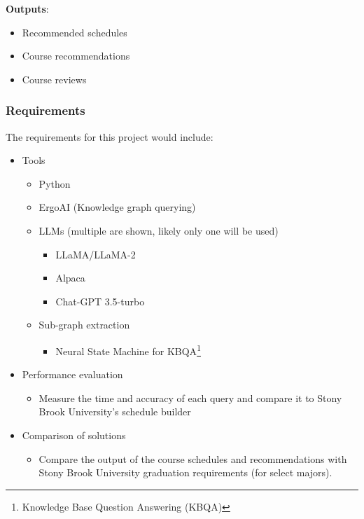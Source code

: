 \documentclass[12pt]{article}
\begin{document}
    \textbf{Outputs}:

    \begin{itemize}
        \label{items:outputs}
        \item Recommended schedules
        \item Course recommendations
        \item Course reviews
    \end{itemize}

    \subsubsection{Requirements}
    \label{subsubsec:reqs}
    The requirements for this project would include:

    \begin{itemize}
        \item Tools
        \begin{itemize}
            \item Python
            \item ErgoAI (Knowledge graph querying)
            \item LLMs (multiple are shown, likely only one will be used)
            \begin{itemize}
                \item LLaMA\cite{touvron2023llama}/LLaMA-2\cite{touvron2023llama2}
                \item Alpaca\cite{alpaca}
                \item Chat-GPT 3.5-turbo\cite{ye2023gpt3.5}
            \end{itemize}
            \item Sub-graph extraction
            \begin{itemize}
                \item Neural State Machine for KBQA\footnote{Knowledge Base Question Answering (KBQA)}\cite{He-WSDM-2021}
            \end{itemize}
        \end{itemize}
        \item Performance evaluation
            \begin{itemize}
                \item Measure the time and accuracy of each query and compare it to Stony Brook University's schedule builder\cite{sched}
            \end{itemize}
        \item Comparison of solutions
            \begin{itemize}
                \item Compare the output of the course schedules and recommendations with Stony Brook University graduation requirements (for select majors).
            \end{itemize}
    \end{itemize}
    
\end{document}

